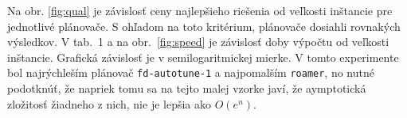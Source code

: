 \documentclass[a4paper,journal]{IEEEtran}
\begin{document}
 Na obr. \ref{fig:qual} je z\'avislos\v t ceny najlep\v sieho rie\v senia od ve\v lkosti in\v stancie pre jednotliv\'e pl\'anova\v ce.
 S oh\v ladom na toto krit\'erium, pl\'anova\v ce dosiahli rovnak\'ych v\'ysledkov.
 V tab.~1 a na  obr.~\ref{fig:speed} je z\'avislos\v t doby v\'ypo\v ctu od ve\v lkosti in\v stancie. Grafick\'a z\'avislos\v t je v semilogaritmickej 
 mierke. V tomto experimente bol najr\'ychle\v s\'im pl\'anova\v c \texttt{fd-autotune-1} a najpomal\v s\'im \texttt{roamer}, no nutn\'e podotkn\'u\v t, 
 \v ze napriek tomu sa na tejto malej vzorke jav\'i, \v ze aymptotick\'a zlo\v zitos\v t \v ziadneho z nich, nie je lep\v sia ako $O(e^n)$.
 
 
 

%


\end{document}
